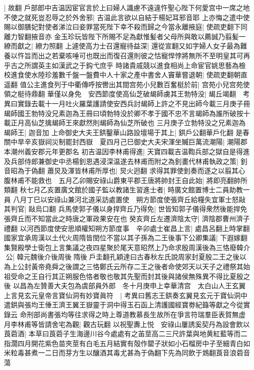 |{
	故翻}
戶部郎中吉温因宦官言於上曰婦人識慮不遠違忤聖心陛下何愛宫中一席之地不使之就死豈忍辱之於外舍邪|{
	吉温此言欲以自結于楊妃耳邪音耶}
上亦悔之遣中使賜以御膳妃對使者涕泣曰妾罪當死陛下幸不殺而歸之今當永離掖庭|{
	使疏吏翻下同離力智翻掖音亦}
金玉珍玩皆陛下所賜不足為獻惟髪者父母所與敢以薦誠乃翦髪一繚而獻之|{
	繚力照翻}
上遽使高力士召還寵待益深|{
	還從宣翻又如字婦人女子最為難養以忤旨而出之若棄咳唾可也既出而復召還則彼之怙寵悍悖將無所不至明皇其可再乎古之所謂英主如漢武之于鈎弋庶乎}
時諸貴戚競以進食相尚上命宦官姚思藝為檢校進食使水陸珍羞數千盤一盤費中人十家之產中書舍人竇華嘗退朝|{
	使疏吏翻朝直遥翻}
值公主進食列于中衢傳呼按轡出其間宫苑小兒數百奮梃於前|{
	宫苑小兒宫苑使領之梃待鼎翻}
華僅以身免　安西節度使高仙芝破朅師虜其王勃特没|{
	朅丘竭翻　考異曰實錄去載十一月吐火羅葉護請使安西兵討朅師上許之不見出師今載三月庚子冊朅師國王勃特没兄素迦為王冊曰頃勃特没於卿不孝于國不忠不言朅師為誰所破按十載正月高仙芝擒朅師王來獻然則朅師為仙芝所破也}
三月庚子立勃特没之兄素迦為朅師王|{
	迦音加}
上命御史大夫王鉷鑿華山路設壇場于其上|{
	鉷戶公翻華戶化翻}
是春關中旱辛亥嶽祠災制罷封西嶽　夏四月己巳御史大夫宋渾坐贓巨萬流潮陽|{
	潮陽郡本潮州義安郡元年更郡名}
初吉温因李林甫得進|{
	天寶四載吉温鞫兵部之獄自是得進}
及兵部侍郎兼御史中丞楊釗恩遇浸深温遂去林甫而附之為釗畫代林甫執政之策|{
	釗音昭為于偽翻}
蕭炅及渾皆林甫所厚也|{
	炅火迥翻}
求得其罪使釗奏而逐之以翦其心腹林甫不能救也　五月乙卯賜安祿山爵東平郡王唐將帥封王自此始|{
	將即亮翻帥所類翻}
秋七月乙亥置廣文館於國子監以教諸生習進士者|{
	時廣文館置博士二員助教一員}
八月丁巳以安祿山兼河北道采訪處置使　朔方節度使張齊丘給糧失宜軍士怒敺其判官|{
	敺烏口翻}
兵馬使郭子儀以身捍齊丘乃得免|{
	世皆知郭子儀得衆然後能捍免張齊丘而不知當此之時唐之軍政果安在也}
癸亥齊丘左遷濟陰太守|{
	濟陰郡曹州濟子禮翻}
以河西節度使安思順權知朔方節度事　辛卯處士崔昌上言|{
	處昌呂翻上時掌翻}
國家宜承周漢以土代火周隋皆閏位不當以其子孫為二王後事下公卿集議|{
	下遐嫁翻}
集賢殿學士衛包上言集議之夜四星聚於尾天意昭然上乃命求殷周漢後為三恪廢韓介公|{
	韓元魏後介後周後隋後戶圭翻孔穎達曰古春秋左氏說周家封夏殷二王之後以為上公封黃帝堯舜之後謂之三恪鄭氏云所存二王之後者命使郊天以天子之禮祭其始祖受命之王自行其正朔服色恪者敬也敬其先聖而封其後與諸侯無殊異不得比夏殷之後}
以昌為左贊善大夫包為虞部員外郎　冬十月庚申上幸華清宫　太白山人王玄翼上言見玄元皇帝言寶仙洞有妙寶眞符　|{
	考異曰舊志王鉷奏玄翼見玄元于寶仙洞中遣鉷與張均王倕王濟王翼王嶽靈于洞中得玉石函上清護國經寶劵紀籙等獻之今從實錄云}
命刑部尚書張均等往求得之時上尊道教慕長生故所在爭言符瑞羣臣表賀無虚月李林甫等皆請舍宅為觀|{
	觀古玩翻}
以祝聖夀上悦　安祿山屢誘奚契丹為設會飲以莨菪酒|{
	本草曰莨菪子生海邊川谷今處處有之苖莖高二三尺許葉與地黄紅藍等而二指濶四月開花紫色苗夾莖有白毛五月結實有殻作罌子狀如小石榴房中子至細青白如米粒毒甚煮一二日而芽方生以釀酒其毒尤甚為于偽翻下先為同飲于鴆翻莨音浪菪音蕩}

